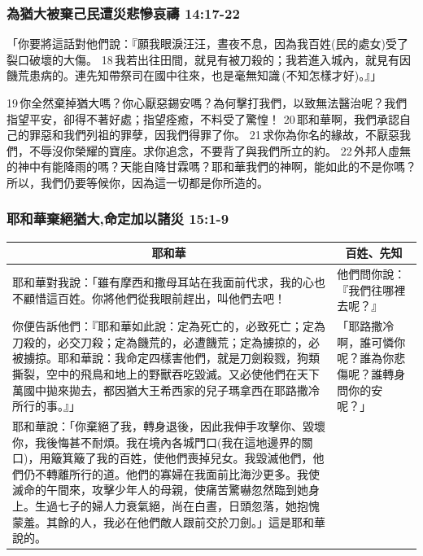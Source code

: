 \subsubsection{為猶大被棄己民遭災悲慘哀禱 14:17-22}
「你要將這話對他們說：『願我眼淚汪汪，晝夜不息，因為我百姓(民的處女)受了裂口破壞的大傷。 18 我若出往田間，就見有被刀殺的；我若進入城內，就見有因饑荒患病的。連先知帶祭司在國中往來，也是毫無知識 (不知怎樣才好)。』」

19 你全然棄掉猶大嗎？你心厭惡錫安嗎？為何擊打我們，以致無法醫治呢？我們指望平安，卻得不著好處；指望痊癒，不料受了驚惶！ 20 耶和華啊，我們承認自己的罪惡和我們列祖的罪孽，因我們得罪了你。 21 求你為你名的緣故，不厭惡我們，不辱沒你榮耀的寶座。求你追念，不要背了與我們所立的約。 22 外邦人虛無的神中有能降雨的嗎？天能自降甘霖嗎？耶和華我們的神啊，能如此的不是你嗎？所以，我們仍要等候你，因為這一切都是你所造的。


\subsubsection{耶和華棄絕猶大,命定加以諸災 15:1-9}
\begin{table}[H]
\centering
\begin{tabular}{p{14.5cm}|p{2.750cm}}\hline\hline
\multicolumn{1}{c|}{耶和華}&\multicolumn{1}{c}{百姓、先知}\\\hline
耶和華對我說：「雖有摩西和撒母耳站在我面前代求，我的心也不顧惜這百姓。你將他們從我眼前趕出，叫他們去吧！ 
&他們問你說：『我們往哪裡去呢？』\\\hline
你便告訴他們：『耶和華如此說：定為死亡的，必致死亡；定為刀殺的，必交刀殺；定為饑荒的，必遭饑荒；定為擄掠的，必被擄掠。耶和華說：我命定四樣害他們，就是刀劍殺戮，狗類撕裂，空中的飛鳥和地上的野獸吞吃毀滅。又必使他們在天下萬國中拋來拋去，都因猶大王希西家的兒子瑪拿西在耶路撒冷所行的事。』」
&「耶路撒冷啊，誰可憐你呢？誰為你悲傷呢？誰轉身問你的安呢？」\\\hline
耶和華說：「你棄絕了我，轉身退後，因此我伸手攻擊你、毀壞你，我後悔甚不耐煩。我在境內各城門口(我在這地邊界的關口)，用簸箕簸了我的百姓，使他們喪掉兒女。我毀滅他們，他們仍不轉離所行的道。他們的寡婦在我面前比海沙更多。我使滅命的午間來，攻擊少年人的母親，使痛苦驚嚇忽然臨到她身上。生過七子的婦人力衰氣絕，尚在白晝，日頭忽落，她抱愧蒙羞。其餘的人，我必在他們敵人跟前交於刀劍。」這是耶和華說的。&\\\hline
\end{tabular}
\end{table}




